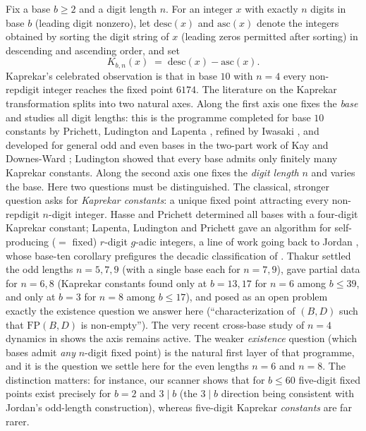 \documentclass[11pt]{amsart}
\theoremstyle{definition}
\begin{document}
Fix a base $b\ge 2$ and a digit length $n$. For an integer $x$ with
exactly $n$ digits in base $b$ (leading digit nonzero), let
$\mathrm{desc}(x)$ and $\mathrm{asc}(x)$ denote the integers obtained by
sorting the digit string of $x$ (leading zeros permitted after sorting)
in descending and ascending order, and set
\[
K_{b,n}(x) \;=\; \mathrm{desc}(x)-\mathrm{asc}(x).
\]
Kaprekar's celebrated observation \cite{Kaprekar} is that in base $10$
with $n=4$ every non-repdigit integer reaches the fixed point $6174$.
The literature on the Kaprekar transformation splits into two natural
axes. Along the first axis one fixes the \emph{base} and studies all
digit lengths: this is the programme completed for base $10$ constants by
Prichett, Ludington and Lapenta \cite{PLL}, refined by Iwasaki
\cite{Iwasaki}, and developed for general odd and even bases in the
two-part work of Kay and Downes-Ward \cite{KD1,KD2}; Ludington
\cite{Ludington} showed that every base admits only finitely many
Kaprekar constants. Along the second
axis one fixes the \emph{digit length} $n$ and varies the base. Here two
questions must be distinguished. The classical, stronger question asks
for \emph{Kaprekar constants}: a unique fixed point attracting every
non-repdigit $n$-digit integer. Hasse and Prichett \cite{HP} determined
all bases with a four-digit Kaprekar constant; Lapenta, Ludington and
Prichett \cite{LLP} gave an algorithm for self-producing ($=$ fixed)
$r$-digit $g$-adic integers, a line of work going back to Jordan
\cite{Jordan64}, whose base-ten corollary prefigures the decadic
classification of \cite{PLL}. Thakur \cite{Thakur19} settled the odd
lengths $n=5,7,9$ (with a single base each for $n=7,9$), gave partial
data for $n=6,8$ (Kaprekar constants found only at $b=13,17$ for $n=6$
among $b\le 39$, and only at $b=3$ for $n=8$ among $b\le 17$), and
posed as an open problem exactly the existence question we answer here
(``characterization of $(B,D)$ such that $\mathrm{FP}(B,D)$ is
non-empty''). The very recent cross-base study of $n=4$ dynamics in
\cite{COST} shows the axis remains active. The weaker \emph{existence}
question (which bases admit \emph{any} $n$-digit fixed point) is the
natural first layer of
that programme, and it is the question we settle here for the even
lengths $n=6$ and $n=8$. The distinction matters: for instance, our
scanner shows that for $b\le 60$ five-digit fixed points exist precisely
for $b=2$ and $3\mid b$ (the $3\mid b$ direction being consistent with
Jordan's odd-length construction), whereas five-digit Kaprekar
\emph{constants} are far rarer.
\end{document}
